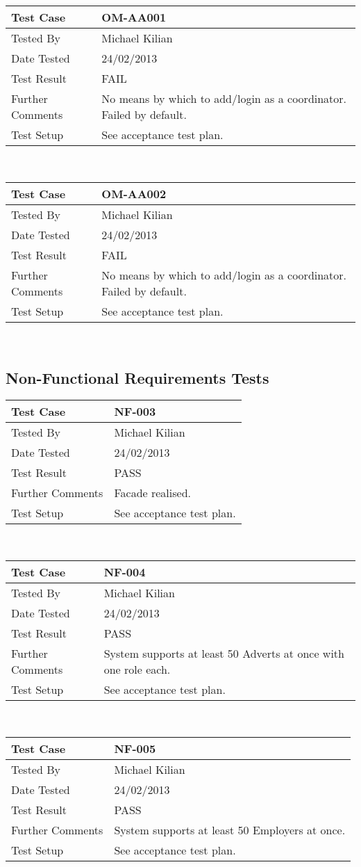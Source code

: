 \documentclass{l3deliverable}
\begin{document}
\begin{tabular}{lp{10cm}}
\hline 
\textbf{Test Case} & OM-AA001\tabularnewline
\hline 
\hline 
Tested By & Michael Kilian\tabularnewline
\hline 
Date Tested & 24/02/2013\tabularnewline
\hline 
Test Result & FAIL\tabularnewline
\hline
Further Comments & No means by which to add/login as a coordinator. Failed by default.\tabularnewline
\hline
Test Setup & See acceptance test plan.\tabularnewline
\hline
\end{tabular}\\

\begin{tabular}{lp{10cm}}
\hline 
\textbf{Test Case} & OM-AA002\tabularnewline
\hline 
\hline 
Tested By & Michael Kilian\tabularnewline
\hline 
Date Tested & 24/02/2013\tabularnewline
\hline 
Test Result & FAIL\tabularnewline
\hline
Further Comments & No means by which to add/login as a coordinator. Failed by default.\tabularnewline
\hline
Test Setup & See acceptance test plan.\tabularnewline
\hline
\end{tabular}\\

\subsection{Non-Functional Requirements Tests}
\begin{tabular}{lp{10cm}}
\hline 
\textbf{Test Case} & NF-003\tabularnewline
\hline 
\hline 
Tested By & Michael Kilian\tabularnewline
\hline 
Date Tested & 24/02/2013\tabularnewline
\hline 
Test Result & PASS\tabularnewline
\hline
Further Comments & Facade realised.\tabularnewline
\hline
Test Setup & See acceptance test plan.\tabularnewline
\hline
\end{tabular}\\

\begin{tabular}{lp{10cm}}
\hline 
\textbf{Test Case} & NF-004\tabularnewline
\hline 
\hline 
Tested By & Michael Kilian\tabularnewline
\hline 
Date Tested & 24/02/2013\tabularnewline
\hline 
Test Result & PASS\tabularnewline
\hline
Further Comments & System supports at least 50 Adverts at once with one role each.\tabularnewline
\hline
Test Setup & See acceptance test plan.\tabularnewline
\hline
\end{tabular}\\

\begin{tabular}{lp{10cm}}
\hline 
\textbf{Test Case} & NF-005\tabularnewline
\hline 
\hline 
Tested By & Michael Kilian\tabularnewline
\hline 
Date Tested & 24/02/2013\tabularnewline
\hline 
Test Result & PASS\tabularnewline
\hline
Further Comments & System supports at least 50 Employers at once.\tabularnewline
\hline
Test Setup & See acceptance test plan.\tabularnewline
\hline
\end{tabular}\\
\end{document}
